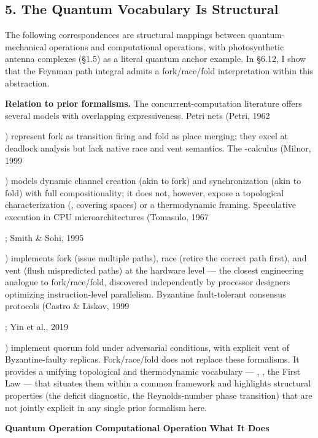 \documentclass[
]{article}
\begin{document}
\subsection{\texorpdfstring{\textbf{5. The Quantum Vocabulary Is
Structural}}{5. The Quantum Vocabulary Is Structural}}\label{the-quantum-vocabulary-is-structural}

The following correspondences are structural mappings between
quantum-mechanical operations and computational operations, with
photosynthetic antenna complexes (§1.5) as a literal quantum anchor
example. In §6.12, I show that the Feynman path integral admits a
fork/race/fold interpretation within this abstraction.

\textbf{Relation to prior formalisms.} The concurrent-computation
literature offers several models with overlapping expressiveness. Petri
nets (Petri, 1962

) represent fork as transition firing and fold as place merging; they
excel at deadlock analysis but lack native race and vent semantics. The
-calculus (Milnor, 1999

) models dynamic channel creation (akin to fork) and synchronization
(akin to fold) with full compositionality; it does not, however, expose
a topological characterization (, covering spaces) or a thermodynamic
framing. Speculative execution in CPU microarchitectures (Tomasulo, 1967

; Smith \& Sohi, 1995

) implements fork (issue multiple paths), race (retire the correct path
first), and vent (flush mispredicted paths) at the hardware level ---
the closest engineering analogue to fork/race/fold, discovered
independently by processor designers optimizing instruction-level
parallelism. Byzantine fault-tolerant consensus protocols (Castro \&
Liskov, 1999

; Yin et al., 2019

) implement quorum fold under adversarial conditions, with explicit vent
of Byzantine-faulty replicas. Fork/race/fold does not replace these
formalisms. It provides a unifying topological and thermodynamic
vocabulary --- , , the First Law --- that situates them within a common
framework and highlights structural properties (the deficit diagnostic,
the Reynolds-number phase transition) that are not jointly explicit in
any single prior formalism here.

\textbf{Quantum Operation} \textbar{} \textbf{Computational Operation}
\textbar{} \textbf{What It Does} \textbar{}
\end{document}
